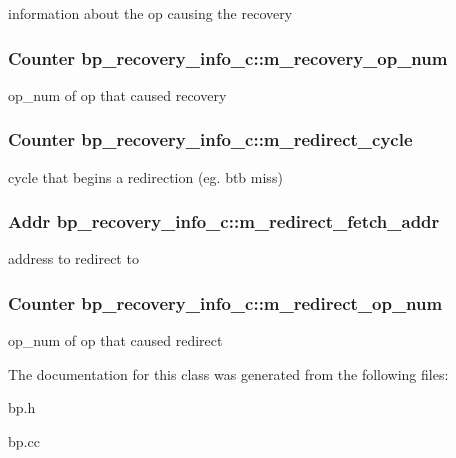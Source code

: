 \label{classbp__recovery__info__c_a8addc9c062b96ddfdec35d817d215117}
information about the op causing the recovery \hypertarget{classbp__recovery__info__c_a4d165d8ea37c2a80f93385010f780b93}{
\subsubsection[{m\_\-recovery\_\-op\_\-num}]{\setlength{\rightskip}{0pt plus 5cm}Counter {\bf bp\_\-recovery\_\-info\_\-c::m\_\-recovery\_\-op\_\-num}}}
\label{classbp__recovery__info__c_a4d165d8ea37c2a80f93385010f780b93}
op\_\-num of op that caused recovery \hypertarget{classbp__recovery__info__c_ae42bca851549fbe1dfbb3b3bb02854af}{
\subsubsection[{m\_\-redirect\_\-cycle}]{\setlength{\rightskip}{0pt plus 5cm}Counter {\bf bp\_\-recovery\_\-info\_\-c::m\_\-redirect\_\-cycle}}}
\label{classbp__recovery__info__c_ae42bca851549fbe1dfbb3b3bb02854af}
cycle that begins a redirection (eg. btb miss) \hypertarget{classbp__recovery__info__c_aa037c488f3aec47db7b5b19eed5ee682}{
\subsubsection[{m\_\-redirect\_\-fetch\_\-addr}]{\setlength{\rightskip}{0pt plus 5cm}Addr {\bf bp\_\-recovery\_\-info\_\-c::m\_\-redirect\_\-fetch\_\-addr}}}
\label{classbp__recovery__info__c_aa037c488f3aec47db7b5b19eed5ee682}
address to redirect to \hypertarget{classbp__recovery__info__c_ad7f574a8e5006bc0f34757bfcd0642b7}{
\subsubsection[{m\_\-redirect\_\-op\_\-num}]{\setlength{\rightskip}{0pt plus 5cm}Counter {\bf bp\_\-recovery\_\-info\_\-c::m\_\-redirect\_\-op\_\-num}}}
\label{classbp__recovery__info__c_ad7f574a8e5006bc0f34757bfcd0642b7}
op\_\-num of op that caused redirect 

The documentation for this class was generated from the following files:\begin{DoxyCompactItemize}
\item 
bp.h\item 
bp.cc\end{DoxyCompactItemize}
